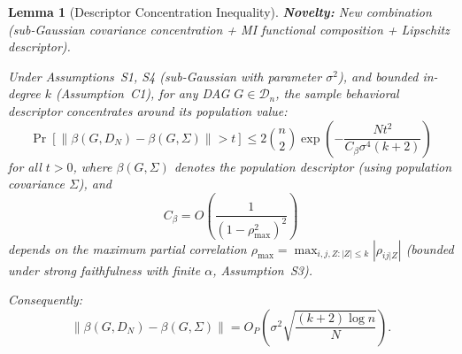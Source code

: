 \documentclass{article}
\theoremstyle{definition}
\theoremstyle{plain}
\newtheorem{lemma}{Lemma}
\theoremstyle{remark}
\begin{document}
\begin{lemma}[Descriptor Concentration Inequality]
\label{lem:descriptor_concentration}
\textbf{Novelty:} New combination (sub-Gaussian covariance concentration + MI functional composition + Lipschitz descriptor).

Under Assumptions~S1, S4 (sub-Gaussian with parameter $\sigma^2$), and bounded
in-degree $k$ (Assumption~C1), for any DAG $G \in \mathcal{D}_n$, the sample
behavioral descriptor concentrates around its population value:
\begin{equation}
\Pr\!\left[\|\beta(G, D_N) - \beta(G, \Sigma)\| > t\right]
\leq 2\binom{n}{2}\exp\!\left(-\frac{N t^2}{C_\beta \sigma^4 (k+2)}\right)
\end{equation}
for all $t > 0$, where $\beta(G, \Sigma)$ denotes the population descriptor
(using population covariance $\Sigma$), and
\begin{equation}
C_\beta = O\!\left(\frac{1}{(1 - \rho_{\max}^2)^2}\right)
\end{equation}
depends on the maximum partial correlation $\rho_{\max} = \max_{i,j,Z : |Z| \leq k} |\rho_{ij|Z}|$
(bounded under strong faithfulness with finite $\alpha$, Assumption~S3).

Consequently:
\begin{equation}
\|\beta(G, D_N) - \beta(G, \Sigma)\| = O_P\!\left(\sigma^2\sqrt{\frac{(k+2)\log n}{N}}\right).
\end{equation}
\end{lemma}
\end{document}
